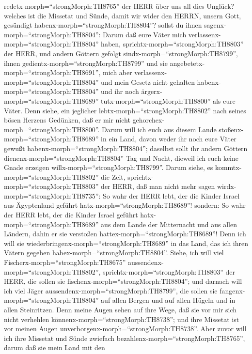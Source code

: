 redetx-morph=``strongMorph:TH8765'' der HERR über uns all dies Unglück?
welches ist die Missetat und Sünde, damit wir wider den HERRN, unsern
Gott, gesündigt habenx-morph=``strongMorph:TH8804''? 
sollst du ihnen sagenx-morph=``strongMorph:TH8804'': Darum daß eure
Väter mich verlassenx-morph=``strongMorph:TH8804'' haben,
sprichtx-morph=``strongMorph:TH8803'' der HERR, und andern Göttern
gefolgt sindx-morph=``strongMorph:TH8799'', ihnen
gedientx-morph=``strongMorph:TH8799'' und sie
angebetetx-morph=``strongMorph:TH8691'', mich aber
verlassenx-morph=``strongMorph:TH8804'' und mein Gesetz nicht gehalten
habenx-morph=``strongMorph:TH8804''  und ihr noch
ärgerx-morph=``strongMorph:TH8689'' tutx-morph=``strongMorph:TH8800''
als eure Väter. Denn siehe, ein jeglicher
lebtx-morph=``strongMorph:TH8802'' nach seines bösen Herzens Gedünken,
daß er mir nicht gehorchex-morph=``strongMorph:TH8800''. 
Darum will ich euch aus diesem Lande
stoßenx-morph=``strongMorph:TH8689'' in ein Land, davon weder ihr noch
eure Väter gewußt habenx-morph=``strongMorph:TH8804''; daselbst sollt
ihr andern Göttern dienenx-morph=``strongMorph:TH8804'' Tag und Nacht,
dieweil ich euch keine Gnade erzeigen
willx-morph=``strongMorph:TH8799''.  Darum siehe, es
kommtx-morph=``strongMorph:TH8802'' die Zeit,
sprichtx-morph=``strongMorph:TH8803'' der HERR, daß man nicht mehr sagen
wirdx-morph=``strongMorph:TH8735'': So wahr der HERR lebt, der die
Kinder Israel aus Ägyptenland geführt hatx-morph=``strongMorph:TH8689''!
 sondern: So wahr der HERR lebt, der die Kinder Israel
geführt hatx-morph=``strongMorph:TH8689'' aus dem Lande der Mitternacht
und aus allen Ländern, dahin er sie verstoßen
hattex-morph=``strongMorph:TH8689''! Denn ich will sie
wiederbringenx-morph=``strongMorph:TH8689'' in das Land, das ich ihren
Vätern gegeben habex-morph=``strongMorph:TH8804''.  Siehe,
ich will viel Fischerx-morph=``strongMorph:TH8675''
aussendenx-morph=``strongMorph:TH8802'',
sprichtx-morph=``strongMorph:TH8803'' der HERR, die sollen sie
fischenx-morph=``strongMorph:TH8804''; und darnach will ich viel Jäger
aussendenx-morph=``strongMorph:TH8799'', die sollen sie
fangenx-morph=``strongMorph:TH8804'' auf allen Bergen und auf allen
Hügeln und in allen Steinritzen.  Denn meine Augen sehen
auf ihre Wege, daß sie vor mir sich nicht verhehlen
könnenx-morph=``strongMorph:TH8738''; und ihre Missetat ist vor meinen
Augen unverborgenx-morph=``strongMorph:TH8738''.  Aber
zuvor will ich ihre Missetat und Sünde zwiefach
bezahlenx-morph=``strongMorph:TH8765'', darum daß sie mein Land mit den
